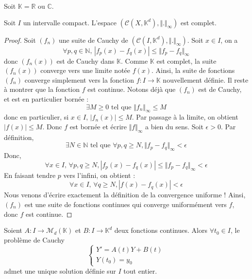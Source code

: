 




	Soit $\mathbb{K} = \mathbb{R}$ ou $\mathbb{C}$.

	\begin{lemma}
		Soit $I$ un intervalle compact. L'espace $(\mathcal{C} (X, \mathbb{K}^d), \Vert . \Vert_{\infty})$ est complet.
	\end{lemma}

	\begin{proof}
		Soit $(f_n)$ une suite de Cauchy de $(\mathcal{C} (I, \mathbb{K}^d), \Vert . \Vert_{\infty})$. Soit $x \in I$, on a
		\[ \forall p, q \in \mathbb{N}, \, |f_p(x) - f_q(x)| \leq \Vert f_p - f_q \Vert_\infty \]
		donc $(f_n(x))$ est de Cauchy dans $\mathbb{K}$. Comme $\mathbb{K}$ est complet, la suite $(f_n(x))$ converge vers une limite notée $f(x)$. Ainsi, la suite de fonctions $(f_n)$ converge simplement vers la fonction $f : I \rightarrow \mathbb{K}$ nouvellement définie. Il reste à montrer que la fonction $f$ est continue.
		\newpar
		Notons déjà que $(f_n)$ est de Cauchy, et est en particulier bornée :
		\[ \exists M \geq 0 \text{ tel que } \Vert f_n \Vert_\infty \leq M \]
		donc en particulier, si $x \in I$, $|f_n(x)| \leq M$. Par passage à la limite, on obtient $|f(x)| \leq M$. Donc $f$ est bornée et écrire $\Vert f \Vert_{\infty}$ a bien du sens.
		\newpar
		Soit $\epsilon > 0$. Par définition,
		\[ \exists N \in \mathbb{N} \text{ tel que } \forall p, q \geq N, \Vert f_p - f_q \Vert_\infty < \epsilon \]
		Donc,
		\[ \forall x \in I, \, \forall p, q \geq N, |f_p(x) - f_q(x)| \leq \Vert f_p - f_q \Vert_\infty < \epsilon \]
		En faisant tendre $p$ vers l'infini, on obtient :
		\[ \forall x \in I, \, \forall q \geq N, |f(x) - f_q(x)| < \epsilon \]
		Nous venons d'écrire exactement la définition de la convergence uniforme ! Ainsi, $(f_n)$ est une suite de fonctions continues qui converge uniformément vers $f$, donc $f$ est continue.
	\end{proof}


	\begin{theorem}
		Soient $A : I \rightarrow \mathcal{M}_d(\mathbb{K})$ et $B : I \rightarrow \mathbb{K}^d$ deux fonctions continues. Alors $\forall t_0 \in I$, le problème de Cauchy
		\[ \begin{cases} Y' = A(t)Y + B(t) \\ Y(t_0) = y_0 \end{cases} \tag{$C$} \]
		admet une unique solution définie sur $I$ tout entier.
	\end{theorem}


